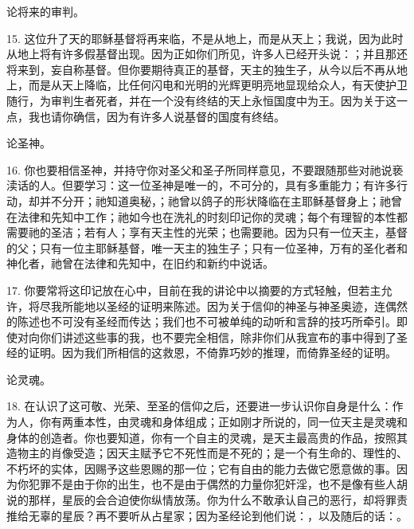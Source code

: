论将来的审判。\par

15. 这位升了天的耶稣基督将再来临，不是从地上，而是从天上；我说，因为此时从地上将有许多假基督出现。因为正如你们所见，许多人已经开头说：；并且那还将来到，妄自称基督。但你要期待真正的基督，天主的独生子，从今以后不再从地上，而是从天上降临，比任何闪电和光明的光辉更明亮地显现给众人，有天使护卫随行，为审判生者死者，并在一个没有终结的天上永恒国度中为王。因为关于这一点，我也请你确信，因为有许多人说基督的国度有终结。\par

论圣神。\par

16. 你也要相信圣神，并持守你对圣父和圣子所同样意见，不要跟随那些对祂说亵渎话的人。但要学习：这一位圣神是唯一的，不可分的，具有多重能力；有许多行动，却并不分开；祂知道奥秘，；祂曾以鸽子的形状降临在主耶稣基督身上；祂曾在法律和先知中工作；祂如今也在洗礼的时刻印记你的灵魂；每个有理智的本性都需要祂的圣洁；若有人；享有天主性的光荣；也需要祂。因为只有一位天主，基督的父；只有一位主耶稣基督，唯一天主的独生子；只有一位圣神，万有的圣化者和神化者，祂曾在法律和先知中，在旧约和新约中说话。\par

17. 你要常将这印记放在心中，目前在我的讲论中以摘要的方式轻触，但若主允许，将尽我所能地以圣经的证明来陈述。因为关于信仰的神圣与神圣奥迹，连偶然的陈述也不可没有圣经而传达；我们也不可被单纯的动听和言辞的技巧所牵引。即使对向你们讲述这些事的我，也不要完全相信，除非你们从我宣布的事中得到了圣经的证明。因为我们所相信的这救恩，不倚靠巧妙的推理，而倚靠圣经的证明。\par

论灵魂。\par

18. 在认识了这可敬、光荣、至圣的信仰之后，还要进一步认识你自身是什么：作为人，你有两重本性，由灵魂和身体组成；正如刚才所说的，同一位天主是灵魂和身体的创造者。你也要知道，你有一个自主的灵魂，是天主最高贵的作品，按照其造物主的肖像受造；因天主赋予它不死性而是不死的；是一个有生命的、理性的、不朽坏的实体，因赐予这些恩赐的那一位；它有自由的能力去做它愿意做的事。因为你犯罪不是由于你的出生，也不是由于偶然的力量你犯奸淫，也不是像有些人胡说的那样，星辰的会合迫使你纵情放荡。你为什么不敢承认自己的恶行，却将罪责推给无辜的星辰？再不要听从占星家；因为圣经论到他们说：，以及随后的话：。\par

